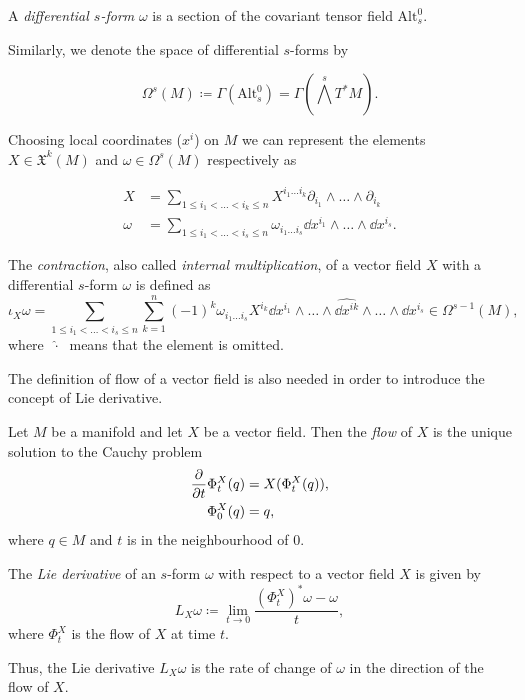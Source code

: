 \begin{definition}
    A \emph{differential $s$-form} $\omega$ is a section of the covariant tensor field $\text{Alt}_s ^0$.
\end{definition}

Similarly, we denote the space of differential $s$-forms by

\begin{equation*}
    \Omega ^s(M) \coloneqq \Gamma (\text{Alt}_s ^0 ) = \Gamma \left( \bigwedge ^s T^*M \right).
\end{equation*}

Choosing local coordinates ($x^i$) on $M$ we can represent the elements $X \in \mathfrak{X}^k(M)$ and $\omega \in \Omega^s(M)$ respectively as

\begin{align*}
    X &= \sum_{1 \leq i_1 < \ldots < i_k \leq n} X^{i_1 \ldots i_k} \partial_{i_1} \wedge \ldots \wedge \partial_{i_k} \\
    \omega &= \sum_{1 \leq i_1 < \ldots < i_s \leq n} \omega_{i_1 \ldots i_s} \dd x^{i_1} \wedge \ldots \wedge \dd x^{i_s}.
\end{align*}

\begin{definition}
    The \emph{contraction}, also called \emph{internal multiplication}, of a vector field $X$ with a differential $s$-form $\omega$ is defined as
    \begin{equation*}
        \iota_X \omega = \sum_{1\leq i_1 < \ldots < i_s \leq n} \sum_{k=1}^n (-1)^k \omega_{i_1 \ldots i_s} X^{i_k} \dd x^{i_1} \wedge \ldots \wedge \widehat{\dd x^{ik}} \wedge \ldots \wedge \dd x^{i_s} \in \Omega^{s-1}(M),
    \end{equation*}
    where $\; \widehat{\cdot} \;$ means that the element is omitted.
\end{definition}

The definition of flow of a vector field is also needed in order to introduce the concept of Lie derivative.

\begin{definition}
    Let $M$ be a manifold and let $X$ be a vector field.
    Then the \emph{flow} of $X$ is the unique solution to the Cauchy problem
    \begin{align*}
        \pderivative{t} \Phi _t ^X (q) &= X(\Phi_t ^X (q)), \\
        \Phi_0 ^X (q) &= q,
    \end{align*}
    where $q \in M$ and $t$ is in the neighbourhood of $0$.
\end{definition}

\begin{definition}
    The \emph{Lie derivative} of an $s$-form $\omega$ with respect to a vector field $X$ is given by
    \begin{equation*}
        L_X \omega \coloneqq \lim _{t \rightarrow 0} \frac{(\Phi_t ^X)^* \omega - \omega}{t},
    \end{equation*}
    where $\Phi_t ^X$ is the flow of $X$ at time $t$.
\end{definition}

Thus, the Lie derivative $L_X \omega$ is the rate of change of $\omega$ in the direction of the flow of $X$.